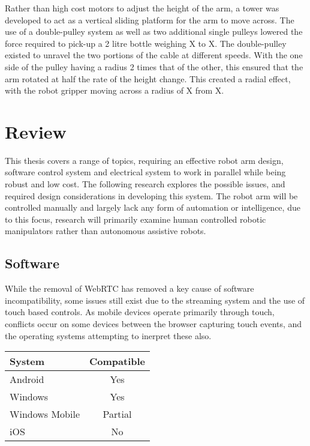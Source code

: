 \documentclass[11pt]{article} %
\newcommand{\tableYes}{{\cellcolor{green!25}}Yes}
\newcommand{\tablePartial}{{\cellcolor{yellow!25}}Partial}
\newcommand{\tableNo}{{\cellcolor{red!25}}No}
\begin{document}
Rather than high cost motors to adjust the height of the arm, a tower was developed to act as a vertical sliding platform for the arm to move across. The use of a double-pulley system as well as two additional single pulleys lowered the force required to pick-up a 2 litre bottle weighing X to X. The double-pulley existed to unravel the two portions of the cable at different speeds. With the one side of the pulley having a radius 2 times that of the other, this ensured that the arm rotated at half the rate of the height change. This created a radial effect, with the robot gripper moving across a radius of X from X.




\section{Review}
This thesis covers a range of topics, requiring an effective robot arm design, software control system and electrical system to work in parallel while being robust and low cost. The following research explores the possible issues, and required design considerations in developing this system.
The robot arm will be controlled manually and largely lack any form of automation or intelligence, due to this focus, research will primarily examine human controlled robotic manipulators rather than autonomous assistive robots.

\subsection{Software}
While the removal of WebRTC has removed a key cause of software incompatibility, some issues still exist due to the streaming system and the use of touch based controls.
As mobile devices operate primarily through touch, conflicts occur on some devices between the browser capturing touch events, and the operating systems attempting to inerpret these also.

\begin{center}
	\begin{tabular}{ | l | c | }
		\hline
		System & Compatible \\ \hline
		Android & \tableYes \\
		Windows & \tableYes \\
		Windows Mobile & \tablePartial \\
		iOS & \tableNo \\
		\hline
	\end{tabular}
\end{center}
\end{document}
